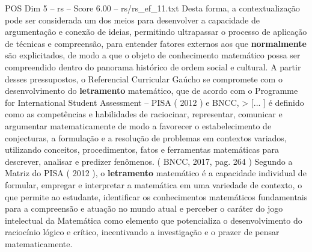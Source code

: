 \begin{textsample}{POS Dim 5 – rs – Score 6.00 – rs/rs\_ef\_11.txt}
Desta forma, a contextualização pode ser considerada um dos meios para desenvolver a capacidade de argumentação e conexão de ideias, permitindo ultrapassar o processo de aplicação de técnicas e compreensão, para entender fatores externos aos que \textbf{normalmente} são explicitados, de modo a que o objeto de conhecimento matemático possa ser compreendido dentro do panorama histórico de ordem social e cultural.
A partir desses pressupostos, o Referencial Curricular Gaúcho se compromete com o desenvolvimento do \textbf{letramento} matemático, que de acordo com o Programme for International Student Assessment – PISA ( 2012 ) e BNCC, > [... ] é definido como as competências e habilidades de raciocinar, representar, comunicar e argumentar matematicamente de modo a favorecer o estabelecimento de conjecturas, a formulação e a resolução de problemas em contextos variados, utilizando conceitos, procedimentos, fatos e ferramentas matemáticas para descrever, analisar e predizer fenômenos. ( BNCC, 2017, pag. 264 ) Segundo a Matriz do PISA ( 2012 ), o \textbf{letramento} matemático é a capacidade individual de formular, empregar e interpretar a matemática em uma variedade de contexto, o que permite ao estudante, identificar os conhecimentos matemáticos fundamentais para a compreensão e atuação no mundo atual e perceber o caráter do jogo intelectual da Matemática como elemento que potencializa o desenvolvimento do raciocínio lógico e crítico, incentivando a investigação e o prazer de pensar matematicamente.

\end{textsample}
